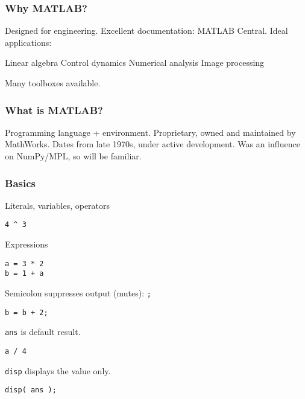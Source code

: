 \documentclass[11pt]{beamer}
\begin{document}
\begin{frame}[fragile]
  \frametitle{Why MATLAB?}
  \Enlarge

  \begin{enumerate}
  \myitem  Designed for engineering.
  \myitem  Excellent documentation:  MATLAB Central.
  \myitem  Ideal applications:
    \begin{enumerate}
    \mysubitem  Linear algebra
    \mysubitem  Control dynamics
    \mysubitem  Numerical analysis
    \mysubitem  Image processing
    \end{enumerate}
  \myitem  Many toolboxes available.
  \end{enumerate}
\end{frame}

\begin{frame}[fragile]
  \frametitle{What is MATLAB?}
  \Enlarge

  \begin{enumerate}
  \myitem  Programming language + environment.
  \myitem  Proprietary, owned and maintained by MathWorks.
  \myitem  Dates from late 1970s, under active development.
  \myitem  Was an influence on NumPy/MPL, so will be familiar.
  \end{enumerate}
\end{frame}

\begin{frame}[fragile]
  \frametitle{Basics}
  \Enlarge

  \begin{enumerate}
  \myitem  Literals, variables, operators
  \end{enumerate}
  \begin{Verbatim}
4 ^ 3
  \end{Verbatim}
  \begin{enumerate}
  \myitem  Expressions
  \end{enumerate}
  \begin{Verbatim}
a = 3 * 2
b = 1 + a
  \end{Verbatim}
  \begin{enumerate}
  \myitem  Semicolon suppresses output (mutes):  \texttt{;}
  \end{enumerate}
  \begin{Verbatim}
b = b + 2;
  \end{Verbatim}
  \begin{enumerate}
  \myitem  \texttt{ans} is default result.
  \end{enumerate}
  \begin{Verbatim}
a / 4
  \end{Verbatim}
  \begin{enumerate}
  \myitem  \texttt{disp} displays the value only.
  \end{enumerate}
  \begin{Verbatim}
disp( ans );
  \end{Verbatim}
\end{frame}
\end{document}
